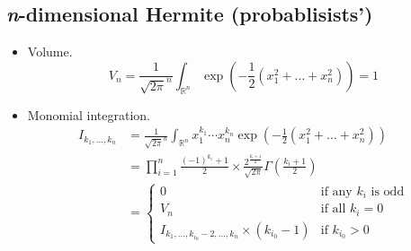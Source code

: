 \documentclass[draft]{scrartcl}
\begin{document}
\subsection*{\textit{n}-dimensional Hermite (probablisists')}
\begin{itemize}
  \item Volume.
\[
  V_n = \frac{1}{\sqrt{2\pi}^n} \int_{\mathbb{R}^n}
  \exp\left(-\frac{1}{2}(x_1^2+\dots+x_n^2)\right) = 1
\]


  \item Monomial integration.
  \[
    \begin{split}
    I_{k_1,\dots,k_n}
      &= \frac{1}{\sqrt{2\pi}^n} \int_{\mathbb{R}^n} x_1^{k_1}\cdots x_n^{k_n}
      \exp\left(-\frac{1}{2}(x_1^2+\dots+x_n^2)\right)\\
    &= \prod_{i=1}^n \frac{(-1)^{k_i} + 1}{2} \times
      \frac{2^{\frac{k_i+1}{2}}}{\sqrt{2\pi}} \Gamma\left(\frac{k_i+1}{2}\right)\\
    &=\begin{cases}
      0&\text{if any $k_i$ is odd}\\
      V_n&\text{if all $k_i=0$}\\
      I_{k_1,\dots,k_{i_0}-2,\dots,k_n} \times (k_{i_0} - 1)&\text{if $k_{i_0} > 0$}
    \end{cases}
    \end{split}
  \]
\end{itemize}


{}

\end{document}
